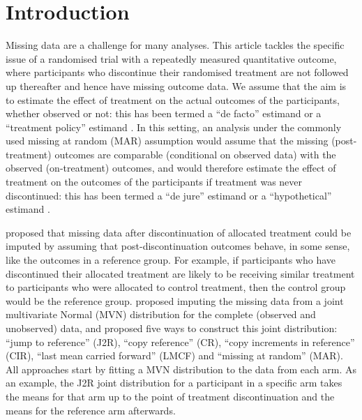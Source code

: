 \maketitle


\section{Introduction}

Missing data are a challenge for many analyses. This article tackles the specific issue of a randomised trial with a repeatedly measured quantitative outcome, where participants who discontinue their randomised treatment are not followed up thereafter and hence have missing outcome data. 
We assume that the aim is to estimate the effect of treatment on the actual outcomes of the participants, whether observed or not: this has been termed a ``de facto'' estimand \citep{Carpenter++13} or a ``treatment policy'' estimand \citep{ICHE9R1}. 
In this setting, an analysis under the commonly used missing at random (MAR) assumption would assume that the missing (post-treatment) outcomes are comparable (conditional on observed data) with the observed (on-treatment) outcomes, and would therefore estimate the effect of treatment on the outcomes of the participants if treatment was never discontinued: this has been termed a ``de jure'' estimand \citep{Carpenter++13} or a ``hypothetical'' estimand \citep{ICHE9R1}. 

\citet{Carpenter++13} proposed that missing data after discontinuation of allocated treatment could be imputed by assuming that post-discontinuation outcomes behave, in some sense, like the outcomes in a reference group. For example, if participants who have discontinued their allocated treatment are likely to be receiving similar treatment to participants who were allocated to control treatment, then the control group would be the reference group.
\citet{Carpenter++13} proposed imputing the missing data from a joint multivariate Normal (MVN) distribution for the complete (observed and unobserved) data, and proposed five ways to construct this joint distribution: ``jump to reference'' (J2R), ``copy reference'' (CR), ``copy increments in reference'' (CIR), ``last mean carried forward'' (LMCF) and ``missing at random'' (MAR). All approaches start by fitting a MVN distribution to the data from each arm. As an example, the J2R joint distribution for a participant in a specific arm takes the means for that arm up to the point of treatment discontinuation and the means for the reference arm afterwards.

